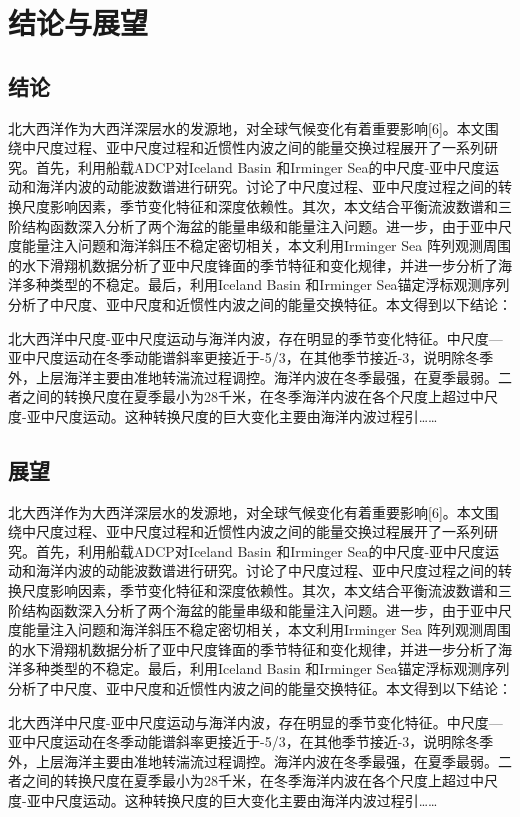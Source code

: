 \chapter{结论与展望}

\section{结论}

北大西洋作为大西洋深层水的发源地，对全球气候变化有着重要影响[6]。本文围绕中尺度过程、亚中尺度过程和近惯性内波之间的能量交换过程展开了一系列研究。首先，利用船载ADCP对Iceland Basin 和Irminger Sea的中尺度-亚中尺度运动和海洋内波的动能波数谱进行研究。讨论了中尺度过程、亚中尺度过程之间的转换尺度影响因素，季节变化特征和深度依赖性。其次，本文结合平衡流波数谱和三阶结构函数深入分析了两个海盆的能量串级和能量注入问题。进一步，由于亚中尺度能量注入问题和海洋斜压不稳定密切相关，本文利用Irminger Sea 阵列观测周围的水下滑翔机数据分析了亚中尺度锋面的季节特征和变化规律，并进一步分析了海洋多种类型的不稳定。最后，利用Iceland Basin 和Irminger Sea锚定浮标观测序列分析了中尺度、亚中尺度和近惯性内波之间的能量交换特征。本文得到以下结论：

北大西洋中尺度-亚中尺度运动与海洋内波，存在明显的季节变化特征。中尺度—亚中尺度运动在冬季动能谱斜率更接近于-5/3，在其他季节接近-3，说明除冬季外，上层海洋主要由准地转湍流过程调控。海洋内波在冬季最强，在夏季最弱。二者之间的转换尺度在夏季最小为28千米，在冬季海洋内波在各个尺度上超过中尺度-亚中尺度运动。这种转换尺度的巨大变化主要由海洋内波过程引……  

\section{展望}

北大西洋作为大西洋深层水的发源地，对全球气候变化有着重要影响[6]。本文围绕中尺度过程、亚中尺度过程和近惯性内波之间的能量交换过程展开了一系列研究。首先，利用船载ADCP对Iceland Basin 和Irminger Sea的中尺度-亚中尺度运动和海洋内波的动能波数谱进行研究。讨论了中尺度过程、亚中尺度过程之间的转换尺度影响因素，季节变化特征和深度依赖性。其次，本文结合平衡流波数谱和三阶结构函数深入分析了两个海盆的能量串级和能量注入问题。进一步，由于亚中尺度能量注入问题和海洋斜压不稳定密切相关，本文利用Irminger Sea 阵列观测周围的水下滑翔机数据分析了亚中尺度锋面的季节特征和变化规律，并进一步分析了海洋多种类型的不稳定。最后，利用Iceland Basin 和Irminger Sea锚定浮标观测序列分析了中尺度、亚中尺度和近惯性内波之间的能量交换特征。本文得到以下结论：

北大西洋中尺度-亚中尺度运动与海洋内波，存在明显的季节变化特征。中尺度—亚中尺度运动在冬季动能谱斜率更接近于-5/3，在其他季节接近-3，说明除冬季外，上层海洋主要由准地转湍流过程调控。海洋内波在冬季最强，在夏季最弱。二者之间的转换尺度在夏季最小为28千米，在冬季海洋内波在各个尺度上超过中尺度-亚中尺度运动。这种转换尺度的巨大变化主要由海洋内波过程引……  